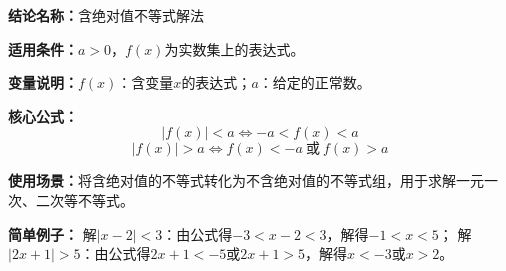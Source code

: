 \textbf{结论名称：}含绝对值不等式解法

\textbf{适用条件：}$a>0$，$f(x)$为实数集上的表达式。

\textbf{变量说明：}$f(x)$：含变量$x$的表达式；$a$：给定的正常数。

\textbf{核心公式：}
\[
\boxed{|f(x)| < a \iff -a < f(x) < a}
\]
\[
\boxed{|f(x)| > a \iff f(x) < -a \ \text{或}\ f(x) > a}
\]

\textbf{使用场景：}将含绝对值的不等式转化为不含绝对值的不等式组，用于求解一元一次、二次等不等式。

\textbf{简单例子：}
解$|x-2|<3$：由公式得$-3<x-2<3$，解得$-1<x<5$；
解$|2x+1|>5$：由公式得$2x+1<-5$或$2x+1>5$，解得$x<-3$或$x>2$。